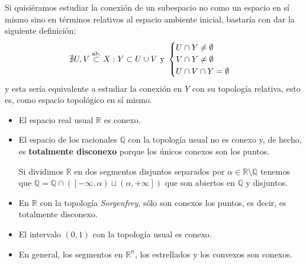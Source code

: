 \begin{obs}
Si quisiéramos estudiar la conexión de un subespacio no como un espacio en sí mismo sino en términos relativos al espacio ambiente inicial, bastaría con dar la siguiente definición:
\[
\nexists U,V \stackrel{\text{ab.}}{\subset} X : Y \subset U \cup V \mbox{ y } \begin{cases}
    U \cap Y \neq \emptyset\\
    V \cap Y \neq \emptyset\\
    U \cap V \cap Y = \emptyset
\end{cases} 
\]
y esta sería equivalente a estudiar la conexión en $Y$ con su topología relativa, esto es, como espacio topológico en sí mismo.
\end{obs}

\begin{ej}
\begin{itemize}
    \item El espacio real usual $\mathbb{R}$ es conexo.
    \item El espacio de los racionales $\mathbb{Q}$ con la topología usual no es conexo y, de hecho, es \textbf{totalmente disconexo} porque los únicos conexos son los puntos.
    \begin{demo}
        Si dividimos $\mathbb{R}$ en dos segmentos disjuntos separados por $\alpha \in \mathbb{R} \setminus \mathbb{Q}$ tenemos que $\mathbb{Q} = \mathbb{Q} \cap \left( \left[ -\infty, \alpha \right) \sqcup \left( \alpha, +\infty \right] \right)$ que son abiertos en $\mathbb{Q}$ y disjuntos.
    \end{demo}
    \item En $\mathbb{R}$ con la topología \textit{Sorgenfrey}, sólo son conexos los puntos, es decir, es totalmente disconexo.
    \item El intervalo $\left( 0, 1 \right)$ con la topología usual es conexo. 
    \item En general, los segmentos en $\mathbb{R}^n$, los estrellados y los convexos son conexos.
\end{itemize}
\end{ej}

